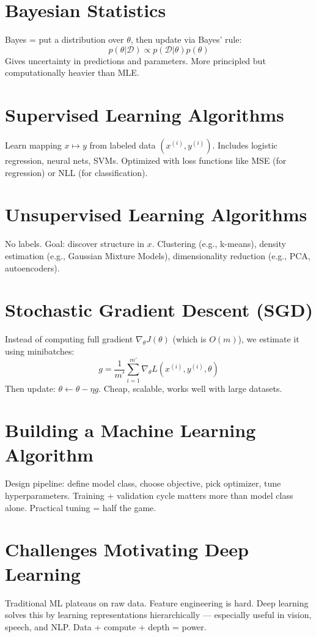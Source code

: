 \documentclass{article}
\theoremstyle{plain}
\theoremstyle{definition}
\begin{document}
\section*{Bayesian Statistics}
Bayes = put a distribution over $\theta$, then update via Bayes’ rule:
\[
p(\theta | \mathcal{D}) \propto p(\mathcal{D} | \theta)p(\theta)
\]
Gives uncertainty in predictions and parameters. More principled but computationally heavier than MLE.

\section*{Supervised Learning Algorithms}
Learn mapping $x \mapsto y$ from labeled data $(x^{(i)}, y^{(i)})$. Includes logistic regression, neural nets, SVMs. Optimized with loss functions like MSE (for regression) or NLL (for classification).

\section*{Unsupervised Learning Algorithms}
No labels. Goal: discover structure in $x$. Clustering (e.g., k-means), density estimation (e.g., Gaussian Mixture Models), dimensionality reduction (e.g., PCA, autoencoders).

\section*{Stochastic Gradient Descent (SGD)}
Instead of computing full gradient $\nabla_\theta J(\theta)$ (which is $O(m)$), we estimate it using minibatches:
\[
g = \frac{1}{m'} \sum_{i=1}^{m'} \nabla_\theta L(x^{(i)}, y^{(i)}, \theta)
\]
Then update: $\theta \leftarrow \theta - \eta g$. Cheap, scalable, works well with large datasets.

\section*{Building a Machine Learning Algorithm}
Design pipeline: define model class, choose objective, pick optimizer, tune hyperparameters. Training + validation cycle matters more than model class alone. Practical tuning = half the game.

\section*{Challenges Motivating Deep Learning}
Traditional ML plateaus on raw data. Feature engineering is hard. Deep learning solves this by learning representations hierarchically — especially useful in vision, speech, and NLP. Data + compute + depth = power.
\end{document}
